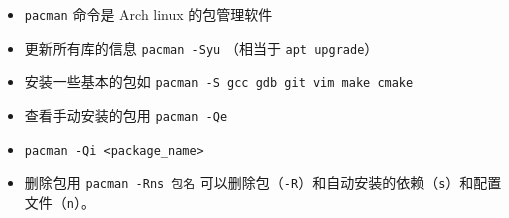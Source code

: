 
\begin{issues}
\issueDraft
\end{issues}

\begin{itemize}
\item \verb`pacman` 命令是 Arch linux 的包管理软件
\item 更新所有库的信息 \verb`pacman -Syu` （相当于 \verb`apt upgrade`）
\item 安装一些基本的包如 \verb`pacman -S gcc gdb git vim make cmake`
\item 查看手动安装的包用 \verb`pacman -Qe`
\item \verb`pacman -Qi <package_name>`
\item 删除包用 \verb`pacman -Rns 包名` 可以删除包（\verb`-R`）和自动安装的依赖（\verb`s`）和配置文件（\verb`n`）。
\end{itemize}
